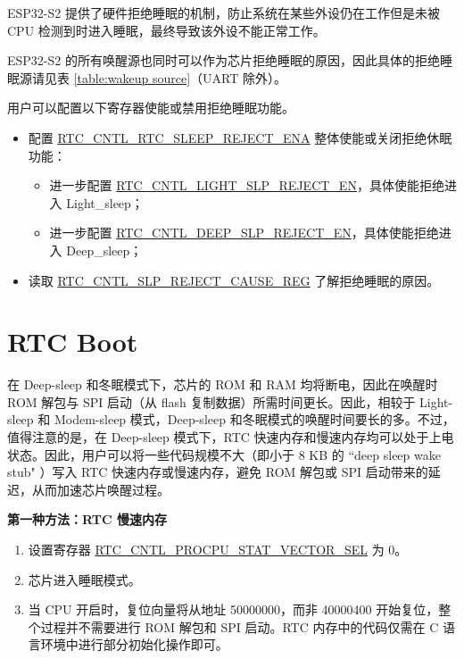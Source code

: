 \documentclass[main\_\_CN.tex]{subfiles}
\begin{document}
ESP32-S2 提供了硬件拒绝睡眠的机制，防止系统在某些外设仍在工作但是未被 CPU 检测到时进入睡眠，最终导致该外设不能正常工作。

ESP32-S2 的所有唤醒源也同时可以作为芯片拒绝睡眠的原因，因此具体的拒绝睡眠源请见表 \ref{table:wakeup source}（UART 除外）。

用户可以配置以下寄存器使能或禁用拒绝睡眠功能。
\begin{itemize}
    \item 配置 \hyperref[fielddesc:RTCCNTLRTCSLEEPREJECTENA]{RTC\_CNTL\_RTC\_SLEEP\_REJECT\_ENA} 整体使能或关闭拒绝休眠功能：
        \begin{itemize}
            \item 进一步配置 \hyperref[fielddesc:RTCCNTLLIGHTSLPREJECTEN]{RTC\_CNTL\_LIGHT\_SLP\_REJECT\_EN}，具体使能拒绝进入 Light\_sleep；
            \item 进一步配置 \hyperref[fielddesc:RTCCNTLDEEPSLPREJECTEN]{RTC\_CNTL\_DEEP\_SLP\_REJECT\_EN}，具体使能拒绝进入 Deep\_sleep；
        \end{itemize}
    \item 读取 \hyperref[fielddesc:RTCCNTLREJECTCAUSE]{RTC\_CNTL\_SLP\_REJECT\_CAUSE\_REG} 了解拒绝睡眠的原因。
\end{itemize}

\section{RTC Boot}
在 Deep-sleep 和冬眠模式下，芯片的 ROM 和 RAM 均将断电，因此在唤醒时 ROM 解包与 SPI 启动（从 flash 复制数据）所需时间更长。因此，相较于 Light-sleep 和 Modem-sleep 模式，Deep-sleep 和冬眠模式的唤醒时间要长的多。不过，值得注意的是，在 Deep-sleep 模式下，RTC 快速内存和慢速内存均可以处于上电状态。因此，用户可以将一些代码规模不大（即小于 8 KB 的 ``deep sleep wake stub" ）写入 RTC 快速内存或慢速内存，避免 ROM 解包或 SPI 启动带来的延迟，从而加速芯片唤醒过程。

\textbf{第一种方法：RTC 慢速内存}
\begin{enumerate}
\item 设置寄存器 \hyperref[fielddesc:RTCCNTLPROCPUSTATVECTORSEL]{RTC\_CNTL\_PROCPU\_STAT\_VECTOR\_SEL} 为 0。
\item 芯片进入睡眠模式。
\item 当 CPU 开启时，复位向量将从地址 \hexprefix{}50000000，而非 \hexprefix{}40000400 开始复位，整个过程并不需要进行 ROM 解包和 SPI 启动。RTC 内存中的代码仅需在 C 语言环境中进行部分初始化操作即可。
\end{enumerate}
\end{document}
